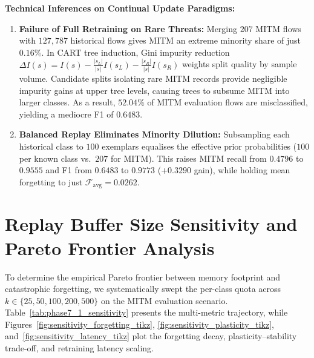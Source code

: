 \textbf{Technical Inferences on Continual Update Paradigms:}
\begin{enumerate}
    \item \textbf{Failure of Full Retraining on Rare Threats:} Merging $207$ MITM flows with $127{,}787$ historical flows gives MITM an extreme minority share of just $0.16\%$. In CART tree induction, Gini impurity reduction $\Delta I(s) = I(s) - \frac{|s_L|}{|s|}I(s_L) - \frac{|s_R|}{|s|}I(s_R)$ weights split quality by sample volume. Candidate splits isolating rare MITM records provide negligible impurity gains at upper tree levels, causing trees to subsume MITM into larger classes. As a result, $52.04\%$ of MITM evaluation flows are misclassified, yielding a mediocre F1 of $0.6483$.
    \item \textbf{Balanced Replay Eliminates Minority Dilution:} Subsampling each historical class to $100$ exemplars equalises the effective prior probabilities ($100$ per known class vs.\ $207$ for MITM). This raises MITM recall from $0.4796$ to $0.9555$ and F1 from $0.6483$ to $0.9773$ ($+0.3290$ gain), while holding mean forgetting to just $\mathcal{F}_{\text{avg}} = 0.0262$.
\end{enumerate}

\section{Replay Buffer Size Sensitivity and Pareto Frontier Analysis}
\label{sec:phase7_1_results}

To determine the empirical Pareto frontier between memory footprint and catastrophic forgetting, we systematically swept the per-class quota across $k \in \{25, 50, 100, 200, 500\}$ on the MITM evaluation scenario. Table~\ref{tab:phase7_1_sensitivity} presents the multi-metric trajectory, while Figures~\ref{fig:sensitivity_forgetting_tikz}, \ref{fig:sensitivity_plasticity_tikz}, and~\ref{fig:sensitivity_latency_tikz} plot the forgetting decay, plasticity--stability trade-off, and retraining latency scaling.

